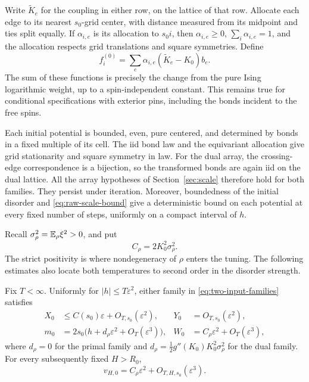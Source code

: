 Write \(\widetilde K_e\) for the coupling in either row, on the lattice
of that row.  Allocate each edge to its nearest \(s_0\)-grid center,
with distance measured from its midpoint and ties split equally.  If
\(\alpha_{i,e}\) is its allocation to \(s_0i\), then
\(\alpha_{i,e}\ge0\), \(\sum_i\alpha_{i,e}=1\), and the allocation
respects grid translations and square symmetries.  Define
\begin{equation}
 f_i^{(0)}=\sum_e\alpha_{i,e}(\widetilde K_e-K_0)b_e.
 \label{eq:initial-array}
\end{equation}
The sum of these functions is precisely the change from the pure Ising
logarithmic weight, up to a spin-independent constant.  This remains
true for conditional specifications with exterior pins, including the
bonds incident to the free spins.

Each initial potential is bounded, even, pure centered, and determined
by bonds in a fixed multiple of its cell.  The iid bond law and the
equivariant allocation give grid stationarity and square symmetry in
law.  For the dual array, the crossing-edge correspondence is a bijection,
so the transformed bonds are again iid on the dual lattice.  All the
array hypotheses of Section~\ref{sec:scale} therefore hold for both
families.  They persist under iteration.  Moreover, boundedness of the
initial disorder and \eqref{eq:raw-scale-bound} give a deterministic
bound on each potential at every fixed number of steps, uniformly on a
compact interval of \(h\).

Recall \(\sigma_\rho^2=\mathbb E_\rho\xi^2>0\), and put
\[
 C_\rho=2K_0^2\sigma_\rho^2.
\]
The strict positivity is where nondegeneracy of \(\rho\) enters the
tuning.  The following estimates also locate both temperatures to
second order in the disorder strength.

\begin{lemma}
\label{lem:initial-coordinates}
Fix \(T<\infty\).  Uniformly for \(|h|\le T\varepsilon^2\), either
family in \eqref{eq:two-input-families} satisfies
\begin{equation}
 \begin{aligned}
 X_0&\le C(s_0)\varepsilon+O_{T,s_0}(\varepsilon^2),
 &Y_0&=O_{T,s_0}(\varepsilon^2),\\
 m_0&=2s_0\bigl(h+d_\rho\varepsilon^2+O_T(\varepsilon^3)\bigr),
 &W_0&=C_\rho\varepsilon^2+O_T(\varepsilon^3),
 \end{aligned}
 \label{eq:initial-coordinate-bounds}
\end{equation}
where \(d_\rho=0\) for the primal family and
\(d_\rho=\tfrac12g''(K_0)K_0^2\sigma_\rho^2\) for the dual family.
For every subsequently fixed \(H>R_0\),
\begin{equation}
 v_{H,0}=C_\rho\varepsilon^2+O_{T,H,s_0}(\varepsilon^3).
 \label{eq:initial-variance}
\end{equation}
\end{lemma}

